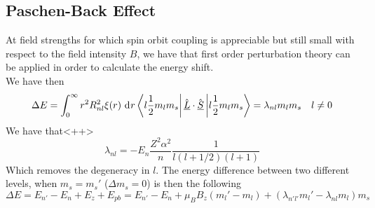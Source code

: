 \documentclass[../qm.tex]{subfiles}
\begin{document}
	\subsection{Paschen-Back Effect}
	At field strengths for which spin orbit coupling is appreciable but still small with respect to the field intensity $B$, we have that first order perturbation theory can be applied in order to calculate the energy shift.\\
	We have then
	\begin{equation}
		\Delta E=\int_{0}^{\infty}r^2R_{nl}^2\xi(r)\ \mathrm{d}^{}r\bra{l\frac{1}{2}m_lm_s}\hat{\underline{L}}\cdot\hat{\underline{S}}\ket{l\frac{1}{2}m_lm_s}=\lambda_{nl}m_lm_s\quad l\ne0
		\label{eq:paschenbackshiftfirstorder}
	\end{equation}
	We have that<++>
	\begin{equation}
		\lambda_{nl}=-E_n\frac{Z^2\alpha^2}{n}\frac{1}{l(l+1/2)(l+1)}
		\label{eq:lambdapb}
	\end{equation}
	Which removes the degeneracy in $l$. The energy difference between two different levels, when $m_s=m_s'$ ($\Delta m_s=0$) is then the following
	\begin{equation}
		\Delta E=E_{n'}-E_n+E_{z}+E_{pb}=E_{n'}-E_n+\mu_BB_z(m_l'-m_l)+(\lambda_{n'l'}m_l'-\lambda_{nl}m_l)m_s
		\label{eq:paschenbackshift}
	\end{equation}
\end{document}
